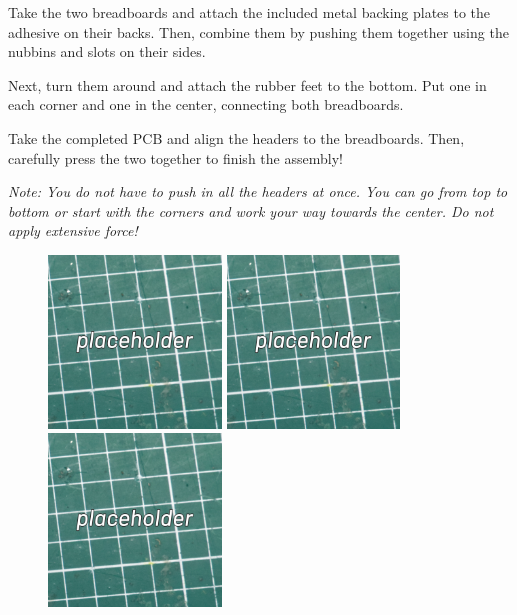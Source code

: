 \documentclass[12pt, a4paper]{article}
\begin{document}
Take the two breadboards and attach the included metal backing plates to the adhesive on their
backs. Then, combine them by pushing them together using the nubbins and slots on their sides.

Next, turn them around and attach the rubber feet to the bottom. Put one in each corner and one
in the center, connecting both breadboards.

Take the completed PCB and align the headers to the breadboards. Then, carefully press the two
together to finish the assembly!

\textit{%
    Note: You do not have to push in all the headers at once. You can go from top to bottom or
    start with the corners and work your way towards the center. Do not apply extensive force!
}

\begin{figure}[H]
    \centering
    \includegraphics[width=46mm]{images/placeholder.jpg}
    \hspace{2mm}
    \includegraphics[width=46mm]{images/placeholder.jpg}
    \hspace{2mm}
    \includegraphics[width=46mm]{images/placeholder.jpg}
\end{figure}
\end{document}
